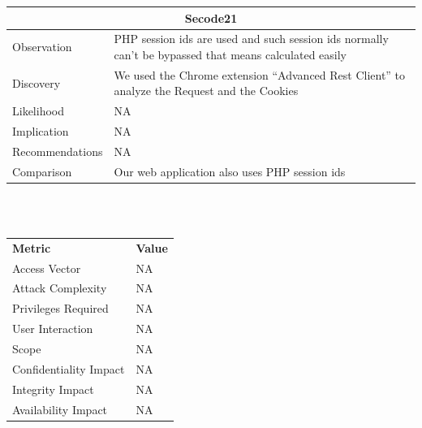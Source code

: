 \documentclass[headsepline,footsepline,footinclude=false,oneside,fontsize=11pt,paper=a4,listof=totoc,bibliography=totoc]{scrbook} %
\begin{document}
\begin{tabular}{ l|p{11cm}  }
	\hline
	\multicolumn{2}{c}{\textbf{Secode21}} \\
	\hline
	Observation   & PHP session ids are used and such session ids normally can't be bypassed that means calculated easily\\
	Discovery  & We used the Chrome extension ``Advanced Rest Client'' to analyze the Request and the Cookies\\
	Likelihood & NA\\
	Implication    & NA\\
	Recommendations& NA\\
	Comparison& Our web application also uses PHP session ids \\
	\hline
\end{tabular}
\\
\vspace{0.5cm}
\\
\begin{center}
	\begin{tabular}{ll}
		\rowcolor[HTML]{34CDF9}
		{\color[HTML]{ECF4FF} \textbf{Metric}}        & {\color[HTML]{ECF4FF} \textbf{Value}} \\
		\rowcolor[HTML]{BBDAFF}
		{\color[HTML]{333333} Access Vector}          & {\color[HTML]{333333} } NA              \\
		\rowcolor[HTML]{ECF4FF}
		{\color[HTML]{333333} Attack Complexity}      & {\color[HTML]{333333} } NA              \\
		\rowcolor[HTML]{BBDAFF}
		{\color[HTML]{333333} Privileges Required}    & {\color[HTML]{333333} } NA              \\
		\rowcolor[HTML]{ECF4FF}
		{\color[HTML]{333333} User Interaction}       & {\color[HTML]{333333} } NA              \\
		\rowcolor[HTML]{BBDAFF}
		{\color[HTML]{333333} Scope}                  & {\color[HTML]{333333} } NA              \\
		\rowcolor[HTML]{ECF4FF}
		{\color[HTML]{333333} Confidentiality Impact} & {\color[HTML]{333333} } NA              \\
		\rowcolor[HTML]{BBDAFF}
		{\color[HTML]{333333} Integrity Impact}       & {\color[HTML]{333333} } NA              \\
		\rowcolor[HTML]{ECF4FF}
		{\color[HTML]{333333} Availability Impact}    & {\color[HTML]{333333} } NA
	\end{tabular}
\end{center}
\end{document}
